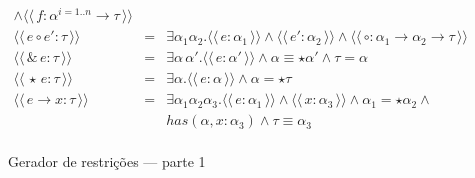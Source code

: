 \documentclass[a4paper,8pt]{article}
\newcommand{\constr}[1]{\ensuremath{\langle\langle\,#1\,\rangle\rangle}}
\begin{document}
\begin{figure}[h]
\[{\begin{array}{lcl}
                                                    \land \constr{f :
                                                    \alpha^{i=1..n}
                                                    \to \tau} \\
                     \constr{e \circ e' : \tau} & = & \exists
                                                      \alpha_1\alpha_2.\constr{e
                                                      :\alpha_1} \land
                                                      \constr{e' :
                                                      \alpha_2} \land
                                                      \constr{\circ :
                                                      \alpha_1\to\alpha_2\to\tau}\\
                     \constr{\&\,e : \tau} & = & \exists \alpha\,
                                                 \alpha'. \constr{e :
                                                 \alpha'} \land
                                                 \alpha \equiv \star \alpha'
                                                 \land \tau = \alpha\\
                     \constr{\star\,e : \tau} & = & \exists
                                                    \alpha. \constr{e
                                                    : \alpha} \land
                                                    \alpha = \star \tau\\
                     \constr{e\to x : \tau} & = & \exists
                                                  \alpha_1\alpha_2\alpha_3. \constr{e
                                                  :\alpha_1} \land
                                                  \constr{x :
                                                  \alpha_3} \land
                                                  \alpha_1 = \star\alpha_2
                                                  \land\\
                          & & has(\alpha,x : \alpha_3) \land \tau
                              \equiv \alpha_3\\
            \end{array}}
       \]
       \centering
       \caption{Gerador de restrições --- parte 1}
       \label{figgen}
     \end{figure}
\end{document}

